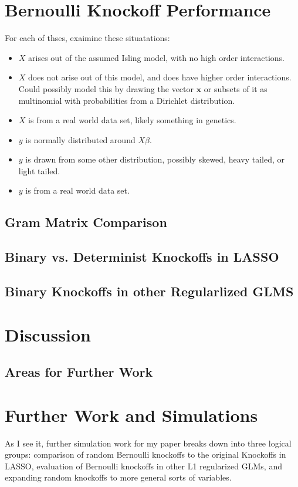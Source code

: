 \documentclass[11pt]{article}
\theoremstyle{definition}
\begin{document}
\section{Bernoulli Knockoff Performance}
For each of thses, exaimine these situatations:
\begin{itemize}
    \item $X$ arises out of the assumed Isling model, with no high order interactions. 
    \item $X$ does not arise out of this model, and does have higher order interactions. Could possibly model this by drawing the vector $\mathbf x$ or subsets of it as multinomial with probabilities from a Dirichlet distribution.
    \item $X$ is from a real world data set, likely something in genetics.
    \item $y$ is normally distributed around $X\beta$.
    \item $y$ is drawn from some other distribution, possibly skewed, heavy tailed, or light tailed.
    \item $y$ is from a real world data set.
\end{itemize}
\subsection{Gram Matrix Comparison}
\subsection{Binary vs. Determinist Knockoffs in LASSO}
\subsection{Binary Knockoffs in other Regularlized GLMS}

\section{Discussion}
\subsection{Areas for Further Work}


\section{Further Work and Simulations}
As I see it, further simulation work for my paper breaks down into three logical groups: comparison of random Bernoulli knockoffs to the original Knockoffs in LASSO, evaluation of Bernoulli knockoffs in other L1 regularized GLMs, and expanding random knockoffs to more general sorts of variables.
\end{document}
